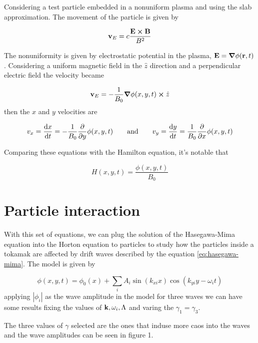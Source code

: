 \documentclass[12pt, a4paper]{article}
\begin{document}
Considering a test particle embedded in a nonuniform plasma and using the slab approximation. The movement of the particle is given by

\begin{equation}
	\vb{v}_E=c\frac{\vb{E}\cp\vb{B}}{B^2}
\end{equation}

The nonuniformity is given by electrostatic potential in the plasma,  $\vb{E}=\grad\phi(\vb{r},t)$. Considering a uniform magnetic field in the $\hat{z}$ direction and a perpendicular electric field the velocity became

\begin{equation}
 	\vb{v}_E=-\frac{1}{B_0}\grad\phi(x,y,t)\cp\hat{z}
 \end{equation} 
 then the $x$ and $y$ velocities are

 \begin{equation}
  	v_x = \dv{x}{t}=-\frac{1}{B_0}\pdv{y}\phi(x,y,t)\qquad \text{and}\qquad v_y = \dv{y}{t}=\frac{1}{B_0}\pdv{x}\phi(x,y,t)
  \end{equation} 

  Comparing these equations with the Hamilton equation, it's notable that

  \begin{equation}
  	H(x,y,t)=\frac{\phi(x,y,t)}{B_0}
  \end{equation}


\section{Particle interaction}

With this set of equations, we can plug the solution of the Hasegawa-Mima equation into the Horton equation to particles to study how the particles inside a tokamak are affected by drift waves described by the equation \ref{eq:hasegawa-mima}. The model is given by

\begin{equation}
	\phi(x,y,t) = \phi_0(x) +\sum_{i} A_i\sin(k_{xi}x)\cos(k_{yi}y-\omega_it) 
\end{equation}
applying $|\phi_i|$ as the wave amplitude in the model for three waves we can have some results fixing the values of $\vb{k},\omega_i,\Lambda$ and varing the $\gamma_1=\gamma_3$. 

The three values of $\gamma$ selected are the ones that induse more caos into the waves and the wave amplitudes can be seen in figure 1.
\end{document}
